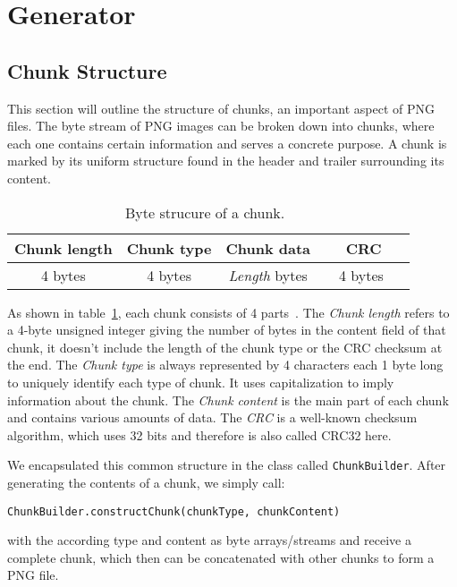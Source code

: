 \documentclass[runningheads]{llncs}
\begin{document}
\section{Generator}
\subsection{Chunk Structure}
This section will outline the structure of chunks, an important aspect of PNG files. The byte stream of PNG images can be broken down into chunks, where each one contains certain information and serves a concrete purpose. A chunk is marked by its uniform structure found in the header and trailer surrounding its content.
\begin{table}
    \caption{Byte strucure of a chunk.~\cite{libpng_file_structure}}
    \label{tab1}
    \begin{center}
        \begin{tabular}{|c|c|c|c|}
            \hline 
            \rule{0pt}{3ex}
            \textbf{ Chunk length } & \textbf{ Chunk type } & \textbf{   Chunk data   } & \textbf{   CRC   } \\ [0.5ex] 
            \hline \hline
            \rule{0pt}{3ex} 
            4 bytes               & 4 bytes             & \textit{Length} bytes        & \ \ 4 bytes \ \     \\ [0.5ex] 
            \hline
        \end{tabular}              
    \end{center}
\end{table}

As shown in table~\ref{tab1}, each chunk consists of 4 parts~\cite{libpng_file_structure}. 
The \textit{Chunk length} refers to a 4-byte unsigned integer giving the number of bytes in the content field of that chunk, it doesn't include the length of the chunk type or the CRC checksum at the end.
The \textit{Chunk type} is always represented by 4 characters each 1 byte long to uniquely identify each type of chunk. It uses capitalization to imply information about the chunk.
The \textit{Chunk content} is the main part of each chunk and contains various amounts of data.
The \textit{CRC} is a well-known checksum algorithm, which uses 32 bits and therefore is also called CRC32 here.

We encapsulated this common structure in the class called \texttt{ChunkBuilder}. After generating the contents of a chunk, we simply call: 
\begin{center}
\texttt{ChunkBuilder.constructChunk(chunkType, chunkContent)} 
\end{center}
with the according type and content as byte arrays/streams and receive a complete chunk, which then can be concatenated with other chunks to form a PNG file. 
\end{document}
